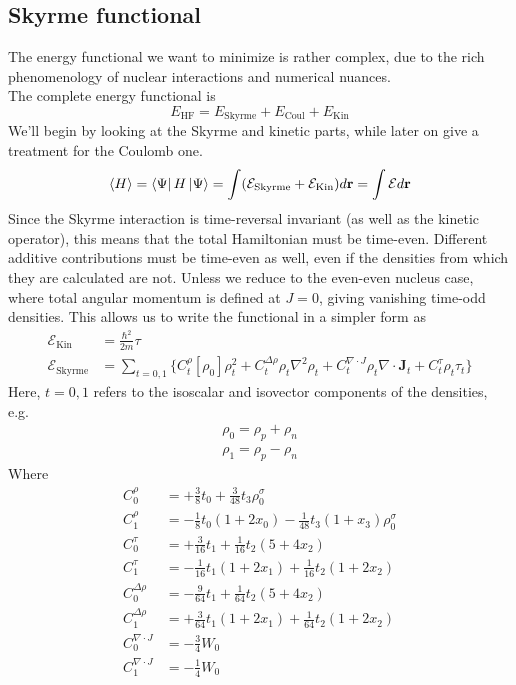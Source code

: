 \subsection{Skyrme functional}
The energy functional we want to minimize is rather complex, due to the rich phenomenology of nuclear interactions and numerical nuances.
\\The complete energy functional is
\begin{equation}
\label{eq:full_functional}
E_{\text{HF}} = E_\text{Skyrme}+E_\text{Coul} + E_\text{Kin}
\end{equation}
We'll begin by looking at the Skyrme and kinetic parts, while later on give a treatment for the Coulomb one.
\begin{equation}
    \label{eq:slater_exp}
    \expval{H} = \bra{\Psi} H \ket{\Psi} = \int (\mathcal E_\text{Skyrme} + \mathcal E_\text{Kin}) d\mathbf r = \int \mathcal E d\mathbf r
\end{equation}
Since the Skyrme interaction is time-reversal invariant (as well as the kinetic operator), this means that the total Hamiltonian must be time-even.
Different additive contributions must be time-even as well, even if the densities from which they are calculated are not. Unless we reduce to the even-even nucleus case, where total angular momentum is defined at $J=0$, giving vanishing time-odd densities.
This allows us to write the functional in a simpler form as \cite{stevenson2019low}
\begin{align}
    \mathcal E_\text{Kin} &= \frac{\hbar^2}{2m}\tau \label{eq:kinfunc}\\
    \mathcal E_\text{Skyrme} &= \sum_{t=0,1}\bigg\{C_t^\rho [\rho_0]\rho_t^2+C_t^{\Delta \rho}\rho_t\nabla^2\rho_t+C_t^{\nabla\cdot J}\rho_t\nabla\cdot \mathbf J_t + C_t^\tau\rho_t\tau_t\bigg\}\label{eq:skfunc}
\end{align}
Here, $t=0,1$ refers to the isoscalar and isovector components of the densities, e.g.
\begin{align*}
    \rho_0 = \rho_p + \rho_n
    \\\rho_1 = \rho_p - \rho_n
\end{align*}
Where
\begin{align}
    C_0^\rho &= +\frac 3 8 t_0 + \frac 3 {48} t_3\rho_0^\sigma \label{eq:C0rho}
    \\C_1^\rho &= -\frac 1 8 t_0(1+2x_0)- \frac 1 {48} t_3(1+x_3)\rho_0^\sigma \label{eq:C1rho}
    \\C_0^\tau &= +\frac 3 {16} t_1 + \frac 1 {16} t_2 (5+4x_2) \label{eq:C0tau}
    \\C_1^\tau &= -\frac 1 {16} t_1(1+2x_1)+\frac 1 {16}t_2(1+2x_2) \label{eq:C1tau}
    \\C_0^{\Delta \rho} &= -\frac 9 {64}t_1+\frac 1 {64}t_2(5+4x_2) \label{eq:C0Deltarho}
    \\C_1^{\Delta \rho} &= +\frac 3 {64}t_1(1+2x_1)+\frac 1 {64}t_2(1+2x_2) \label{eq:C1Deltarho}
    \\C_0^{\nabla\cdot J} &= -\frac 3 4 W_0 \label{eq:C0nabladotJ}
    \\C_1^{\nabla\cdot J} &= -\frac 1 4 W_0 \label{eq:C1nabladotJ}
\end{align}
